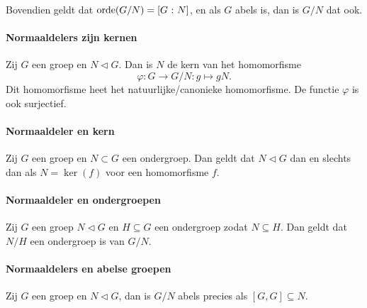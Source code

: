 Bovendien geldt dat \(\operatorname{orde}(G/N)=\left[G\>\colon N\right]\), en als \(G\) abels is, dan is \(G/N\) dat ook.

\paragraph{Normaaldelers zijn kernen} Zij \(G\) een groep en \(N\triangleleft G\). Dan is \(N\) de kern van het homomorfisme
\[
    \varphi\colon G\to G/N\colon g\mapsto gN.
\]
Dit homomorfisme heet het natuurlijke/canonieke homomorfisme. De functie \(\varphi\) is ook surjectief.

\paragraph{Normaaldeler en kern} Zij \(G\) een groep en \(N\subset G\) een ondergroep. Dan geldt dat \(N\triangleleft G\) dan en slechts dan als \(N=\ker(f)\) voor een homomorfisme \(f\).

\paragraph{Normaaldeler en ondergroepen} Zij \(G\) een groep \(N\triangleleft G\) en \(H\subseteq G\) een ondergroep zodat \(N\subseteq H\). Dan geldt dat \(N/H\) een ondergroep is van \(G/N\).

\paragraph{Normaaldelers en abelse groepen} Zij \(G\) een groep en \(N\triangleleft G\), dan is \(G/N\) abels precies als \([G,G]\subseteq N\).